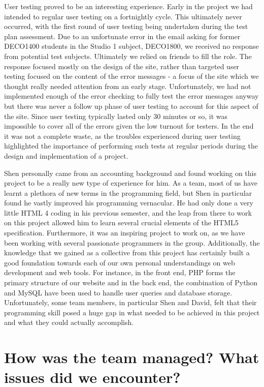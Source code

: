 \documentclass[10pt]{article}
\begin{document}
User testing proved to be an interesting experience. Early in the project we had intended to regular user testing on a fortnightly cycle. This ultimately never occurred, with the first round of user testing being undertaken during the test plan assessment. Due to an unfortunate error in the email asking for former DECO1400 students in the Studio 1 subject, DECO1800, we received no response from potential test subjects. Ultimately we relied on friends to fill the role. The response focused mostly on the design of the site, rather than targeted user testing focused on the content of the error messages - a focus of the site which we thought really needed attention from an early stage. Unfortunately, we had not implemented enough of the error checking to fully test the error messages anyway but there was never a follow up phase of user testing to account for this aspect of the site. Since user testing typically lasted only 30 minutes or so, it was impossible to cover all of the errors given the low turnout for testers. In the end it was not a complete waste, as the troubles experienced during user testing highlighted the importance of performing such tests at regular periods during the design and implementation of a project.

Shen personally came from an accounting background and found working on this project to be a really new type of experience for him. As a team, most of us have learnt a plethora of new terms in the programming field, but Shen in particular found he vastly improved his programming vernacular. He had only done a very little HTML 4 coding in his previous semester, and the leap from there to work on this project allowed him to learn several crucial elements of the HTML5 specification. Furthermore, it was an inspiring project to work on, as we have been working with several passionate programmers in the group. Additionally, the knowledge that we gained as a collective from this project has certainly built a good foundation towards each of our own personal understandings on web development and web tools. For instance, in the front end, PHP forms the primary structure of our website and in the back end, the combination of Python and MySQL have been used to handle user queries and database storage. Unfortunately, some team members, in particular Shen and David, felt that their programming skill posed a huge gap in what needed to be achieved in this project and what they could actually accomplish.

\section{How was the team managed? What issues did we encounter?}
\end{document}
